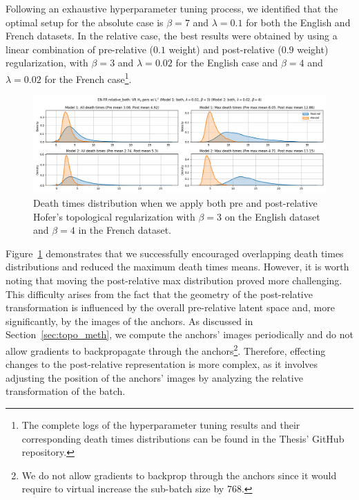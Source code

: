 \documentclass[../main.tex]{subfiles}
\begin{document}
Following an exhaustive hyperparameter tuning process, we identified that the optimal setup for the absolute case is $\beta=7$ and $\lambda=0.1$ for both the English and French datasets. In the relative case, the best results were obtained by using a linear combination of pre-relative ($0.1$ weight) and post-relative ($0.9$ weight) regularization, with $\beta=3$ and $\lambda=0.02$ for the English case and $\beta=4$ and $\lambda=0.02$ for the French case\footnote{The complete logs of the hyperparameter tuning results and their corresponding death times distributions can be found in the Thesis' GitHub repository.}.\\


\begin{figure}[ht!]
    \centering
    \includegraphics[width=\textwidth]{figures/rs/stitching/en_fr_relative_both_both_both_3_4_seed1.png} 
    \caption{Death times distribution when we apply both pre and post-relative Hofer's topological regularization with $\beta=3$ on the English dataset and $\beta=4$ in the French dataset.}
    \label{fig:distBoth}
\end{figure}


Figure~\ref{fig:distBoth} demonstrates that we successfully encouraged overlapping death times distributions and reduced the maximum death times means. However, it is worth noting that moving the post-relative max distribution proved more challenging. This difficulty arises from the fact that the geometry of the post-relative transformation is influenced by the overall pre-relative latent space and, more significantly, by the images of the anchors. As discussed in Section~\ref{sec:topo_meth}, we compute the anchors' images periodically and do not allow gradients to backpropagate through the anchors\footnote{We do not allow gradients to backprop through the anchors since it would require to virtual increase the sub-batch size by 768.}. Therefore, effecting changes to the post-relative representation is more complex, as it involves adjusting the position of the anchors' images by analyzing the relative transformation of the batch.\\
\end{document}

